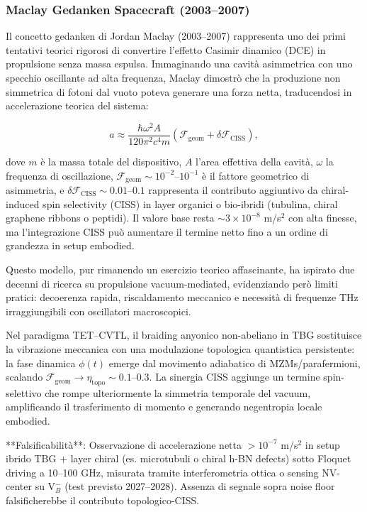 \documentclass[11pt,a4paper]{article}
\theoremstyle{plain}
\theoremstyle{definition}
\begin{document}
\subsubsection{Maclay Gedanken Spacecraft (2003--2007)}

Il concetto gedanken di Jordan Maclay (2003--2007) rappresenta uno dei primi tentativi teorici rigorosi di convertire l'effetto Casimir dinamico (DCE) in propulsione senza massa espulsa. Immaginando una cavità asimmetrica con uno specchio oscillante ad alta frequenza, Maclay dimostrò che la produzione non simmetrica di fotoni dal vuoto poteva generare una forza netta, traducendosi in accelerazione teorica del sistema:

\begin{equation}
a \approx \frac{\hbar \omega^2 A}{120 \pi^2 c^4 m} \left( \mathcal{F}_{\mathrm{geom}} + \delta \mathcal{F}_{\mathrm{CISS}} \right),
\label{eq:maclay-accel-updated}
\end{equation}

dove $m$ è la massa totale del dispositivo, $A$ l'area effettiva della cavità, $\omega$ la frequenza di oscillazione, $\mathcal{F}_{\mathrm{geom}} \sim 10^{-2}$--$10^{-1}$ è il fattore geometrico di asimmetria, e $\delta \mathcal{F}_{\mathrm{CISS}} \sim 0.01$--$0.1$ rappresenta il contributo aggiuntivo da chiral-induced spin selectivity (CISS) in layer organici o bio-ibridi (tubulina, chiral graphene ribbons o peptidi). Il valore base resta $\sim 3 \times 10^{-8}$ m/s$^2$ con alta finesse, ma l'integrazione CISS può aumentare il termine netto fino a un ordine di grandezza in setup embodied.

Questo modello, pur rimanendo un esercizio teorico affascinante, ha ispirato due decenni di ricerca su propulsione vacuum-mediated, evidenziando però limiti pratici: decoerenza rapida, riscaldamento meccanico e necessità di frequenze THz irraggiungibili con oscillatori macroscopici.

Nel paradigma TET–CVTL, il braiding anyonico non-abeliano in TBG sostituisce la vibrazione meccanica con una modulazione topologica quantistica persistente: la fase dinamica $\phi(t)$ emerge dal movimento adiabatico di MZMs/parafermioni, scalando $\mathcal{F}_{\mathrm{geom}} \to \eta_{\mathrm{topo}} \sim 0.1$--$0.3$. La sinergia CISS aggiunge un termine spin-selettivo che rompe ulteriormente la simmetria temporale del vacuum, amplificando il trasferimento di momento e generando negentropia locale embodied.

**Falsificabilità**: Osservazione di accelerazione netta $> 10^{-7}$ m/s$^2$ in setup ibrido TBG + layer chiral (es. microtubuli o chiral h-BN defects) sotto Floquet driving a 10–100 GHz, misurata tramite interferometria ottica o sensing NV-center su V$_B^-$ (test previsto 2027–2028). Assenza di segnale sopra noise floor falsificherebbe il contributo topologico-CISS.
\end{document}
